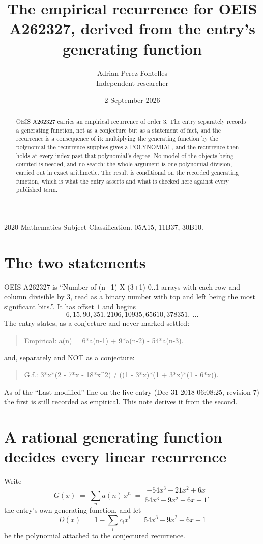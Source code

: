 \documentclass[11pt,a4paper]{article}
\title{The empirical recurrence for OEIS A262327, derived from the entry's generating function}
\author{Adrian Perez Fontelles\\ \small Independent researcher}
\date{2 September 2026}
\theoremstyle{plain}
\theoremstyle{definition}
\begin{document}
\maketitle

\begin{abstract}
OEIS A262327 carries an empirical recurrence of order $3$. The entry separately records a
generating function, not as a conjecture but as a statement of fact, and the recurrence is a
consequence of it: multiplying the generating function by the polynomial the recurrence
supplies gives a POLYNOMIAL, and the recurrence then holds at every index past that
polynomial's degree. No model of the objects being counted is needed, and no search: the
whole argument is one polynomial division, carried out in exact arithmetic. The result is
conditional on the recorded generating function, which is what the entry asserts and what is
checked here against every published term.
\end{abstract}

\noindent\small 2020 Mathematics Subject Classification. 05A15, 11B37, 30B10.\normalsize

\section{The two statements}

OEIS A262327 is ``Number of (n+1) X (3+1) 0..1 arrays with each row and column divisible by 3, read as a binary number with top and left being the most significant bits.''. It has offset $1$ and begins
\[
6, 15, 90, 351, 2106, 10935, 65610, 378351,\ \dots
\]
The entry states, as a conjecture and never marked settled:
\begin{quote}
Empirical: a(n) = 6*a(n-1) + 9*a(n-2) - 54*a(n-3).
\end{quote}
and, separately and NOT as a conjecture:
\begin{quote}
G.f.: 3*x*(2 - 7*x - 18*x\^{}2) / ((1 - 3*x)*(1 + 3*x)*(1 - 6*x)).
\end{quote}
As of the ``Last modified'' line on the live entry (Dec 31 2018 06:08:25, revision 7) the first is still
recorded as empirical. This note derives it from the second.

\section{A rational generating function decides every linear recurrence}

Write
\[
G(x)\;=\;\sum_{n}a(n)\,x^{n}\;=\;\frac{- 54 x^{3} - 21 x^{2} + 6 x}{54 x^{3} - 9 x^{2} - 6 x + 1},
\]
the entry's own generating function, and let
\[
D(x)\;=\;1-\sum_i c_i x^{i}\;=\;54 x^{3} - 9 x^{2} - 6 x + 1
\]
be the polynomial attached to the conjectured recurrence.
\end{document}
